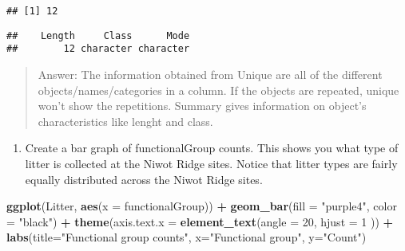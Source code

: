 \documentclass[
]{article}
\newenvironment{Shaded}{\begin{snugshade}}{\end{snugshade}}
\newcommand{\DataTypeTok}[1]{\textcolor[rgb]{0.13,0.29,0.53}{#1}}
\newcommand{\DecValTok}[1]{\textcolor[rgb]{0.00,0.00,0.81}{#1}}
\newcommand{\KeywordTok}[1]{\textcolor[rgb]{0.13,0.29,0.53}{\textbf{#1}}}
\newcommand{\NormalTok}[1]{#1}
\newcommand{\OperatorTok}[1]{\textcolor[rgb]{0.81,0.36,0.00}{\textbf{#1}}}
\newcommand{\StringTok}[1]{\textcolor[rgb]{0.31,0.60,0.02}{#1}}
\providecommand{\tightlist}{%
  \setlength{\itemsep}{0pt}\setlength{\parskip}{0pt}}
\begin{document}
\begin{verbatim}
## [1] 12
\end{verbatim}

\begin{Shaded}
\end{Shaded}

\begin{verbatim}
##    Length     Class      Mode 
##        12 character character
\end{verbatim}

\begin{quote}
Answer: The information obtained from Unique are all of the different
objects/names/categories in a column. If the objects are repeated,
unique won't show the repetitions. Summary gives information on object's
characteristics like lenght and class.
\end{quote}

\begin{enumerate}
\def\labelenumi{\arabic{enumi}.}
\setcounter{enumi}{13}
\tightlist
\item
  Create a bar graph of functionalGroup counts. This shows you what type
  of litter is collected at the Niwot Ridge sites. Notice that litter
  types are fairly equally distributed across the Niwot Ridge sites.
\end{enumerate}

\begin{Shaded}
\begin{Highlighting}[]
\KeywordTok{ggplot}\NormalTok{(Litter, }\KeywordTok{aes}\NormalTok{(}\DataTypeTok{x =}\NormalTok{ functionalGroup)) }\OperatorTok{+}
\StringTok{  }\KeywordTok{geom_bar}\NormalTok{(}\DataTypeTok{fill =} \StringTok{"purple4"}\NormalTok{, }\DataTypeTok{color =} \StringTok{"black"}\NormalTok{) }\OperatorTok{+}
\StringTok{  }\KeywordTok{theme}\NormalTok{(}\DataTypeTok{axis.text.x =} \KeywordTok{element_text}\NormalTok{(}\DataTypeTok{angle =} \DecValTok{20}\NormalTok{, }\DataTypeTok{hjust =} \DecValTok{1}\NormalTok{ )) }\OperatorTok{+}
\StringTok{  }\KeywordTok{labs}\NormalTok{(}\DataTypeTok{title=}\StringTok{"Functional group counts"}\NormalTok{, }\DataTypeTok{x=}\StringTok{"Functional group"}\NormalTok{, }\DataTypeTok{y=}\StringTok{"Count"}\NormalTok{)}
\end{Highlighting}
\end{Shaded}
\end{document}
